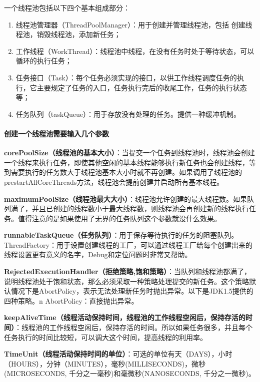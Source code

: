 \documentclass[../../../interview-questions.tex]{subfiles}
\begin{document}
一个线程池包括以下四个基本组成部分：

\begin{enumerate}
    \item {线程池管理器（ThreadPoolManager）：用于创建并管理线程池，包括 创建线程池，销毁线程池，添加新任务；}
    \item {工作线程（WorkThread）：线程池中线程，在没有任务时处于等待状态，可以循环的执行任务；}
    \item {任务接口（Task）：每个任务必须实现的接口，以供工作线程调度任务的执行，它主要规定了任务的入口，任务执行完后的收尾工作，任务的执行状态等；}
    \item {任务队列（taskQueue）：用于存放没有处理的任务。提供一种缓冲机制。}
\end{enumerate}


\paragraph{创建一个线程池需要输入几个参数}

\textbf{corePoolSize（线程池的基本大小）}：当提交一个任务到线程池时，线程池会创建一个线程来执行任务，即使其他空闲的基本线程能够执行新任务也会创建线程，等到需要执行的任务数大于线程池基本大小时就不再创建。如果调用了线程池的prestartAllCoreThreads方法，线程池会提前创建并启动所有基本线程。

\textbf{maximumPoolSize（线程池最大大小）}：线程池允许创建的最大线程数。如果队列满了，并且已创建的线程数小于最大线程数，则线程池会再创建新的线程执行任务。值得注意的是如果使用了无界的任务队列这个参数就没什么效果。

\textbf{runnableTaskQueue（任务队列）}：用于保存等待执行的任务的阻塞队列。
ThreadFactory：用于设置创建线程的工厂，可以通过线程工厂给每个创建出来的线程设置更有意义的名字，Debug和定位问题时非常又帮助。

\textbf{RejectedExecutionHandler（拒绝策略,饱和策略）}：当队列和线程池都满了，说明线程池处于饱和状态，那么必须采取一种策略处理提交的新任务。这个策略默认情况下是AbortPolicy，表示无法处理新任务时抛出异常。以下是JDK1.5提供的四种策略。n  AbortPolicy：直接抛出异常。

\textbf{keepAliveTime（线程活动保持时间，线程池的​​工作线程空闲后​​​，​​保持存活的时间​​​）}：线程池的工作线程空闲后，保持存活的时间。所以如果任务很多，并且每个任务执行的时间比较短，可以调大这个时间，提高线程的利用率。

\textbf{TimeUnit（线程活动保持时间的单位）}：可选的单位有天（DAYS），小时（HOURS），分钟（MINUTES），毫秒(MILLISECONDS)，微秒(MICROSECONDS, 千分之一毫秒)和毫微秒(NANOSECONDS, 千分之一微秒)。
\end{document}
